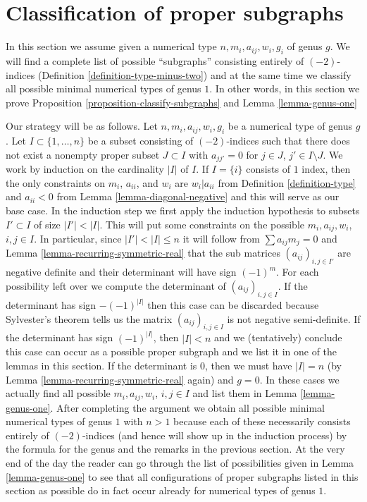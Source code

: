 \documentclass{stacks-project}
\theoremstyle{plain}
\theoremstyle{definition}
\theoremstyle{remark}
\numberwithin{equation}{subsection}
\begin{document}
\section{Classification of proper subgraphs}
\label{section-classify-proper-subgraphs}

\noindent
In this section we assume given a numerical type
$n, m_i, a_{ij}, w_i, g_i$ of genus $g$. We will find
a complete list of possible ``subgraphs'' consisting entirely
of $(-2)$-indices (Definition \ref{definition-type-minus-two}) and
at the same time we classify all possible minimal numerical
types of genus $1$. In other words, in this section we prove
Proposition \ref{proposition-classify-subgraphs} and
Lemma \ref{lemma-genus-one}

\medskip\noindent
Our strategy will be as follows. Let $n, m_i, a_{ij}, w_i, g_i$
be a numerical type of genus $g$. Let $I \subset \{1, \ldots, n\}$ be a subset
consisting of $(-2)$-indices such that there does not exist a nonempty proper
subset $J \subset I$ with $a_{jj'} = 0$ for $j \in J$, $j' \in I \setminus J$.
We work by induction on the cardinality $|I|$ of $I$. If $I = \{i\}$
consists of $1$ index, then the only constraints on $m_i$, $a_{ii}$,
and $w_i$ are $w_i | a_{ii}$ from Definition \ref{definition-type}
and $a_{ii} < 0$ from Lemma \ref{lemma-diagonal-negative}
and this will serve as our base case. In the induction step
we first apply the induction hypothesis to subsets $I' \subset I$
of size $|I'| < |I|$. This will put some constraints on the possible
$m_i, a_{ij}, w_i$, $i, j \in I$. In particular, since $|I'| < |I| \leq n$
it will follow from $\sum a_{ij}m_j = 0$ and
Lemma \ref{lemma-recurring-symmetric-real} that the
sub matrices $(a_{ij})_{i, j \in I'}$ are negative definite
and their determinant will have sign $(-1)^m$.
For each possibility left over we compute the determinant of
$(a_{ij})_{i, j \in I}$. If the determinant has sign $-(-1)^{|I|}$
then this case can be discarded because Sylvester's theorem tells
us the matrix $(a_{ij})_{i, j \in I}$ is not negative semi-definite.
If the determinant has sign $(-1)^{|I|}$, then $|I| < n$ and we
(tentatively) conclude this case can occur as a possible proper subgraph
and we list it in one of the lemmas in this section.
If the determinant is $0$, then we must have $|I| = n$
(by Lemma \ref{lemma-recurring-symmetric-real} again) and $g = 0$.
In these cases we actually find all possible $m_i, a_{ij}, w_i$, $i, j \in I$
and list them in Lemma \ref{lemma-genus-one}. After completing the
argument we obtain all possible minimal numerical types of genus
$1$ with $n > 1$ because each of these necessarily consists entirely
of $(-2)$-indices (and hence will show up in the induction process)
by the formula for the genus and the remarks in the previous section.
At the very end of the day the reader can go through the list of
possibilities given in Lemma \ref{lemma-genus-one} to see that all
configurations of proper subgraphs listed in this section as possible
do in fact occur already for numerical types of genus $1$.
\end{document}
